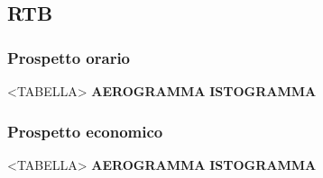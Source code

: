 \subsection{RTB}

\subsubsection{Prospetto orario}

<TABELLA>
\textbf{AEROGRAMMA}
\textbf{ISTOGRAMMA}

\subsubsection{Prospetto economico}

<TABELLA>
\textbf{AEROGRAMMA}
\textbf{ISTOGRAMMA}

